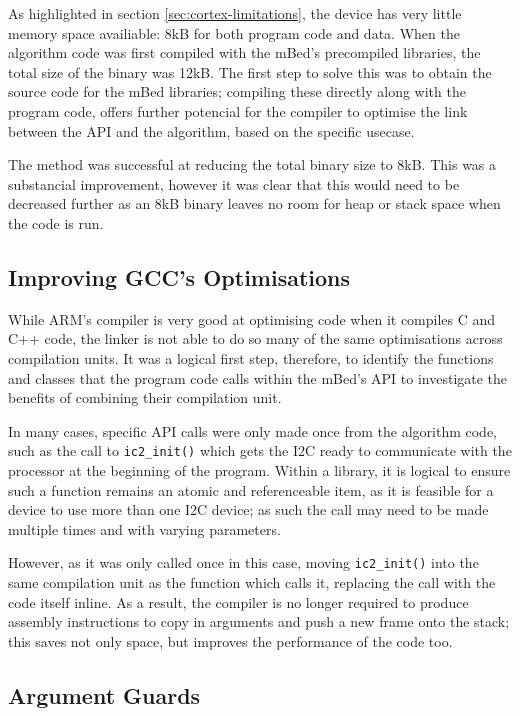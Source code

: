 
As highlighted in section \ref{sec:cortex-limitations}, the device has very little memory space availiable: 8kB for both program code and data. When the algorithm code was first compiled with the mBed's precompiled libraries, the total size of the binary was 12kB. The first step to solve this was to obtain the source code for the mBed libraries; compiling these directly along with the program code, offers further potencial for the compiler to optimise the link between the API and the algorithm, based on the specific usecase.

The method was successful at reducing the total binary size to 8kB. This was a substancial improvement, however it was clear that this would need to be decreased further as an 8kB binary leaves no room for heap or stack space when the code is run.

\subsection{Improving GCC's Optimisations}

While ARM's compiler is very good at optimising code when it compiles C and C++ code, the linker is not able to do so many of the same optimisations across compilation units. It was a logical first step, therefore, to identify the functions and classes that the program code calls within the mBed's API to investigate the benefits of combining their compilation unit.

In many cases, specific API calls were only made once from the algorithm code, such as the call to \verb|ic2_init()| which gets the I2C ready to communicate with the processor at the beginning of the program. Within a library, it is logical to ensure such a function remains an atomic and referenceable item, as it is feasible for a device to use more than one I2C device; as such the call may need to be made multiple times and with varying parameters.

However, as it was only called once in this case, moving \verb|ic2_init()| into the same compilation unit as the function which calls it, replacing the call with the code itself inline. As a result, the compiler is no longer required to produce assembly instructions to copy in arguments and push a new frame onto the stack; this saves not only space, but improves the performance of the code too.

\subsection{Argument Guards}

